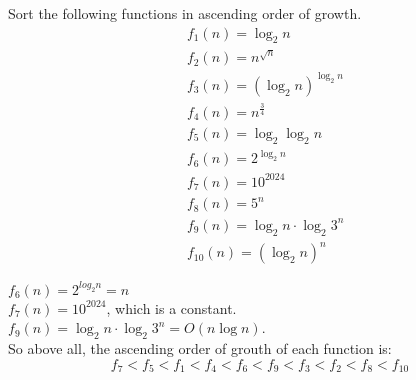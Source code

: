 \problem{}

Sort the following functions in ascending order of growth.
\begin{align}
    &f_1(n)=\log_2{n} \\
    &f_2(n)=n^{\sqrt{n}} \\
    &f_3(n)=(\log_2{n})^{\log_2{n}} \\
    &f_4(n)=n^{\frac{3}{4}}  \\
    &f_5(n)=\log_2{\log_2{n}} \\
    &f_6(n)=2^{\log_2{n}}  \\
    &f_7(n)=10^{2024}  \\
    &f_8(n)=5^n \\
    &f_9(n)=\log_2{n}\cdot\log_2{3^n} \\
    &f_{10}(n)=(\log_2{n})^n
\end{align}

\solution{}

$f_6(n)=2^{log_2{n}}=n$\\
$f_7(n)=10^{2024}$, which is a constant.\\
$f_9(n)=\log_2{n}\cdot\log_2{3^n}=O(n\log n)$.\\

So above all, the ascending order of grouth of each function is:
$$f_7<f_5<f_1<f_4<f_6<f_9<f_3<f_2<f_8<f_{10}$$

\newpage